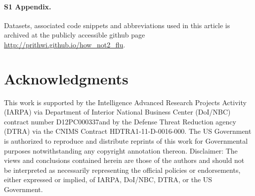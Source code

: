 \documentclass[10pt,letterpaper]{article}
\begin{document}
\paragraph*{S1 Appendix.}
\label{S1_Appendix}
Datasets, associated code snippets and abbreviations used in this article is archived at the
publicly accessible github page \url{http://prithwi.github.io/how_not2_flu}.


\section*{Acknowledgments}
This work is supported by the Intelligence Advanced Research Projects Activity
(IARPA) via Department of Interior National Business Center (DoI/NBC) contract
number D12PC000337and by the Defense Threat Reduction agency (DTRA) via the
CNIMS Contract HDTRA1-11-D-0016-000. The US Government is authorized to
reproduce and distribute reprints of this work for Governmental purposes
notwithstanding any copyright annotation thereon. Disclaimer: The views and
conclusions contained herein are those of the authors and should not be
interpreted as necessarily representing the official policies or endorsements,
either expressed or implied, of IARPA, DoI/NBC, DTRA, or the US Government.

\nolinenumbers

% 

\end{document}
